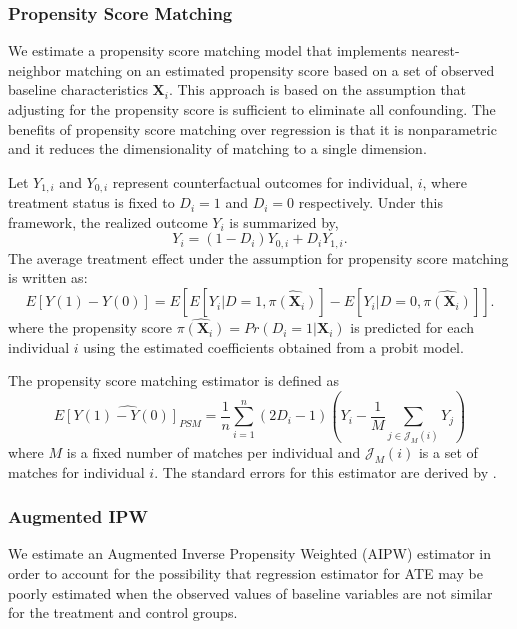 \subsubsection{Propensity Score Matching}  \label{subsubsection:psm}

We estimate a propensity score matching model that implements nearest-neighbor matching on an estimated propensity score based on a set of observed baseline characteristics $\boldsymbol{X}_i$. This approach is based on the assumption that adjusting for the propensity score is sufficient to eliminate all confounding. The benefits of propensity score matching over regression is that it is nonparametric and it reduces the dimensionality of matching to a single dimension.

Let $Y_{1,i}$ and $Y_{0,i}$ represent counterfactual outcomes for individual, $i$, where treatment status is fixed to $D_i=1$ and $D_i=0$ respectively. Under this framework, the realized outcome $Y_i$ is summarized by,
\begin{equation}\label{eq:roy}
Y_i = (1-D_i)Y_{0,i} + D_iY_{1,i}.
\end{equation}
The average treatment effect under the assumption for propensity score matching is written as:
\begin{equation} \label{eq:ATE-PSM}
E[Y(1)-Y(0)] = E[E[Y_i|D=1, \hat{\pi(\boldsymbol{X}_i)}] - E[Y_i|D=0, \hat{\pi(\boldsymbol{X}_i)}]].
\end{equation}
where the propensity score $\hat{\pi({\boldsymbol{X}_i})} = Pr(D_i=1|\boldsymbol{X}_i)$ is predicted for each individual $i$ using the estimated coefficients obtained from a probit model.

The propensity score matching estimator is defined as
\begin{equation} \label{eq:PSM-estimator}
\widehat{E[Y(1)-Y(0)]_{PSM}} = \frac{1}{n} \sum_{i=1}^{n} (2D_i -1)(Y_i - \frac{1}{M}\sum_{j \in \mathcal{J}_M(i)}Y_j )
\end{equation}
where $M$ is a fixed number of matches per individual and $\mathcal{J}_M(i)$ is a set of matches for individual $i$. The standard errors for this estimator are derived by \cite{Abadie_Imbens_2006_Econometrica}.

\subsubsection{Augmented IPW} \label{subsubsection:aipw}

We estimate an Augmented Inverse Propensity Weighted (AIPW) estimator in order to account for the possibility that regression estimator for ATE may be poorly estimated when the observed values of baseline variables are not similar for the treatment and control groups.

